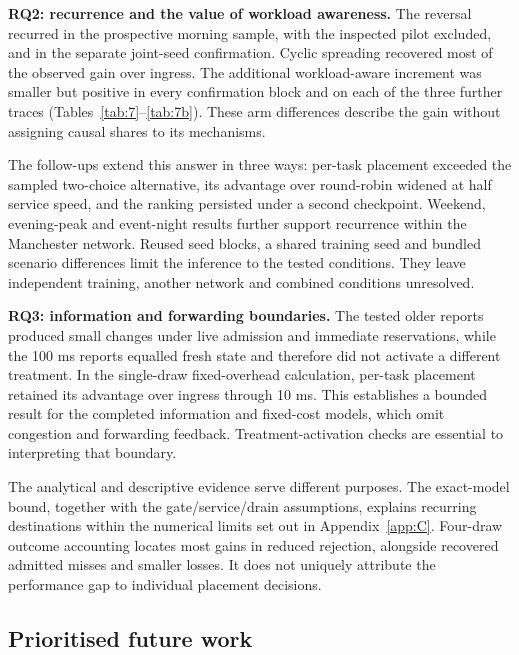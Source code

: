 \documentclass[12pt,a4paper]{article}
\begin{document}
\textbf{RQ2: recurrence and the value of workload awareness.} The reversal recurred in the prospective morning sample, with the inspected pilot excluded, and in the separate joint-seed confirmation. Cyclic spreading recovered most of the observed gain over ingress. The additional workload-aware increment was smaller but positive in every confirmation block and on each of the three further traces (Tables~\ref{tab:7}--\ref{tab:7b}). These arm differences describe the gain without assigning causal shares to its mechanisms.

The follow-ups extend this answer in three ways: per-task placement exceeded the sampled two-choice alternative, its advantage over round-robin widened at half service speed, and the ranking persisted under a second checkpoint. Weekend, evening-peak and event-night results further support recurrence within the Manchester network. Reused seed blocks, a shared training seed and bundled scenario differences limit the inference to the tested conditions. They leave independent training, another network and combined conditions unresolved.

\textbf{RQ3: information and forwarding boundaries.} The tested older reports produced small changes under live admission and immediate reservations, while the 100 ms reports equalled fresh state and therefore did not activate a different treatment. In the single-draw fixed-overhead calculation, per-task placement retained its advantage over ingress through 10 ms. This establishes a bounded result for the completed information and fixed-cost models, which omit congestion and forwarding feedback. Treatment-activation checks are essential to interpreting that boundary.

The analytical and descriptive evidence serve different purposes. The exact-model bound, together with the gate/service/drain assumptions, explains recurring destinations within the numerical limits set out in Appendix~\ref{app:C}. Four-draw outcome accounting locates most gains in reduced rejection, alongside recovered admitted misses and smaller losses. It does not uniquely attribute the performance gap to individual placement decisions.

\FloatBarrier
\subsection{Prioritised future work}\label{sec:4.4}
\end{document}
